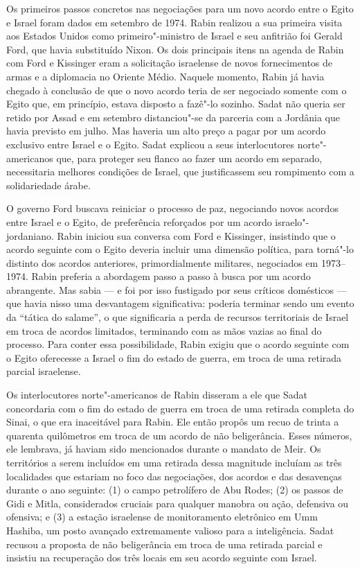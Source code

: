 Os primeiros passos concretos nas negociações para um novo acordo entre
o Egito e Israel foram dados em setembro de 1974. Rabin realizou a sua
primeira visita aos Estados Unidos como primeiro"-ministro de Israel e
seu anfitrião foi Gerald Ford, que havia substituído Nixon. Os dois
principais itens na agenda de Rabin com Ford e Kissinger eram a
solicitação israelense de novos fornecimentos de armas e a diplomacia no
Oriente Médio. Naquele momento, Rabin já havia chegado à conclusão de que o
novo acordo teria de ser negociado somente com o Egito que, em
princípio, estava disposto a fazê"-lo sozinho. Sadat não queria ser
retido por Assad e em setembro distanciou"-se da parceria com a Jordânia
que havia previsto em julho. Mas haveria um alto preço a pagar por um
acordo exclusivo entre Israel e o Egito. Sadat explicou a seus
interlocutores norte"-americanos que, para proteger seu flanco ao fazer um
acordo em separado, necessitaria melhores condições de Israel, que
justificassem seu rompimento com a solidariedade árabe.

O governo Ford buscava reiniciar o processo de paz, negociando novos
acordos entre Israel e o Egito, de preferência reforçados por um acordo
israelo"-jordaniano. Rabin iniciou sua conversa com Ford e Kissinger,
insistindo que o acordo seguinte com o Egito deveria incluir uma
dimensão política, para torná"-lo distinto dos acordos anteriores,
primordialmente militares, negociados em 1973--1974. Rabin preferia a
abordagem passo a passo à busca por um acordo abrangente. Mas sabia --- e
foi por isso fustigado por seus críticos domésticos --- que havia nisso
uma desvantagem significativa: poderia terminar sendo um evento da
``tática do salame'', o que significaria a perda de recursos territoriais de Israel 
em troca de acordos limitados, terminando com as mãos vazias ao final do
processo. Para conter essa possibilidade, Rabin exigiu que o acordo
seguinte com o Egito oferecesse a Israel o fim do estado de guerra, em
troca de uma retirada parcial israelense.

Os interlocutores norte"-americanos de Rabin disseram a ele que Sadat
concordaria com o fim do estado de guerra em troca de uma retirada
completa do Sinai, o que era inaceitável para Rabin. Ele então propôs um
recuo de trinta a quarenta quilômetros em troca de um acordo de
não beligerância. Esses números, ele lembrava, já haviam sido
mencionados durante o mandato de Meir. Os territórios a serem incluídos
em uma retirada dessa magnitude incluíam as três localidades que
estariam no foco das negociações, dos acordos e das desavenças durante o
ano seguinte: (1) o campo petrolífero de Abu Rodes; (2) os passos de
Gidi e Mitla, considerados cruciais para qualquer manobra ou ação,
defensiva ou ofensiva; e (3) a estação israelense de monitoramento
eletrônico em Umm Hashiba, um posto avançado extremamente valioso para a
inteligência. Sadat recusou a proposta de não beligerância em troca de
uma retirada parcial e insistiu na recuperação dos três locais em seu
acordo seguinte com Israel.

